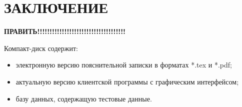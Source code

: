 \newpage
\section*{ЗАКЛЮЧЕНИЕ}
\textbf{ПРАВИТЬ!!!!!!!!!!!!!!!!!!!!!!!!!!!!!!!!!!!!}

\newpage
\renewcommand{\refname}{Список использованных источников}


Компакт-диск содержит: 
\begin{itemize}
\item электронную версию пояснительной записки в форматах *.tex и *.pdf;
\item актуальную версию клиентской программы с графическим интерфейсом;
\item базу данных, содержащую тестовые данные.
\end{itemize}


